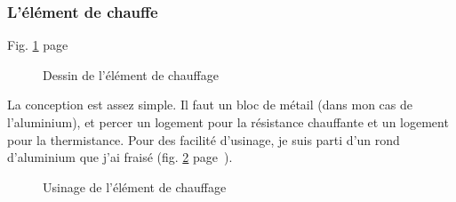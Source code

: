 \subsubsection{L'élément de chauffe}%
Fig. \ref{sch_chauffe} page~\pageref{sch_chauffe} \par %
\begin{figure}%
   \caption{\label{sch_chauffe} Dessin de l'élément de chauffage}%
\end{figure}%
La conception est assez simple. Il faut un bloc de métail (dans mon cas de l'aluminium), et%
percer un logement pour la résistance chauffante et un logement pour la thermistance.%
Pour des facilité d'usinage, je suis parti d'un rond d'aluminium que j'ai fraisé %
(fig. \ref{usinage_chauffe} page~\pageref{usinage_chauffe}).%
\begin{figure}%
   \caption{\label{usinage_chauffe} Usinage de l'élément de chauffage}%
\end{figure}%
